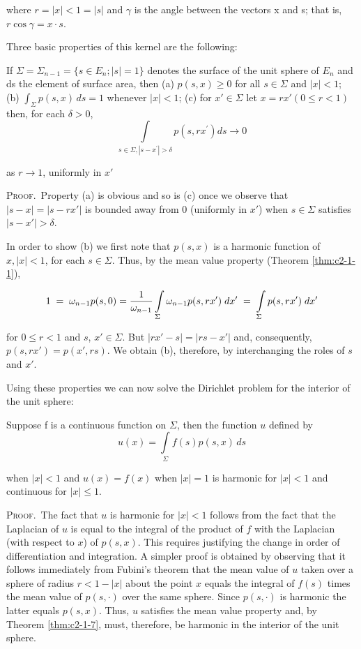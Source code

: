 where $r = |x| < 1 = |s|$ and $\gamma$ is the angle between the vectors x and s; that is, $r \cos \gamma = x \cdot s$.

Three basic properties of this kernel are the following:

\begin{theorem}
\label{thm:c2-1-9}
If $\Sigma = \Sigma_{n-1} = \{s \in E_n; |s| = 1\}$ denotes the surface of the unit sphere of $E_n$ and ds the element of surface area, then
(a) $p(s, x) \geq 0$ for all $s \in \Sigma$ and $|x| < 1$;
(b) $\int_{\Sigma} p(s, x) \, ds = 1$ whenever $|x| < 1$;
(c) for $x' \in \Sigma$ let $x = rx' (0 \leq r < 1)$ then, for each $\delta > 0$,
\[
\int\limits_{s\in\Sigma,|s-x^{\prime}|>\delta}p(s,r x^{\prime}) d s\to0
\]

as $r \to 1$, uniformly in $x'$
\end{theorem}

\textsc{Proof.}\ Property (a) is obvious and so is (c) once we observe that $|s - x| = |s - rx'|$ is bounded away from 0 (uniformly in $x'$) when $s \in \Sigma$ satisfies $|s - x'| > \delta$.

In order to show (b) we first note that $p(s, x)$ is a harmonic function of $x, |x| < 1$, for each $s \in \Sigma$. Thus, by the mean value property (Theorem \ref{thm:c2-1-1}),

\[
1\;=\;\omega_{n-1}p(s,0)=\frac{1}{\omega_{n-1}}\intop_{\Sigma}\omega_{n-1}p(s,r x^{\prime})\;d x^{\prime}\;=\;\intop_{\Sigma}p(s,r x^{\prime})\;d x^{\prime}
\]

for $0 \leq r < 1$ and $s$, $x' \in \Sigma$. But $|rx' - s| = |rs - x'|$ and, consequently, $p(s, rx') = p(x', rs)$. We obtain (b), therefore, by interchanging the roles of $s$ and $x'$.

Using these properties we can now solve the Dirichlet problem for the interior of the unit sphere:

\begin{theorem}
\label{thm:c2-1-10}
Suppose f is a continuous function on $\Sigma$, then the function $u$ defined by
\[
u(x)=\int\limits_{\Sigma}f(s)p(s,x)\,ds
\]

when $|x| < 1$ and $u(x) = f(x)$ when $|x| = 1$ is harmonic for $|x| < 1$ and continuous for $|x| \leq 1$.
\end{theorem}

\textsc{Proof.}\ The fact that $u$ is harmonic for $|x|<1$ follows from the fact that the Laplacian of $u$ is equal to the integral of the product of $f$ with the Laplacian (with respect to $x$) of $p(s,x)$. This requires justifying the change in order of differentiation and integration. A simpler proof is obtained by observing that it follows immediately from Fubini's theorem that the mean value of $u$ taken over a sphere of radius $r<1-|x|$ about the point $x$ equals the integral of $f(s)$ times the mean value of $p(s,\cdot)$ over the same sphere. Since $p(s,\cdot)$ is harmonic the latter equals $p(s,x)$. Thus, $u$ satisfies the mean value property and, by Theorem \ref{thm:c2-1-7}, must, therefore, be harmonic in the interior of the unit sphere.

